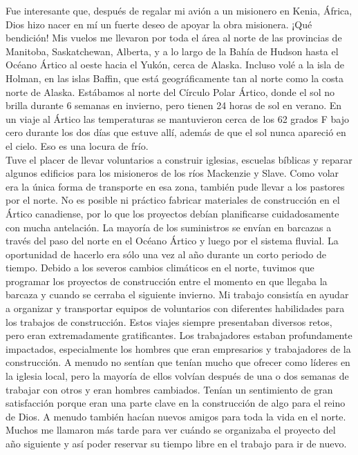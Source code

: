 \documentclass[twoside, 12pt]{book}
\begin{document}
Fue interesante que, después de regalar mi avión a un misionero en Kenia, África, Dios hizo nacer en mí un fuerte deseo de apoyar la obra misionera. ¡Qué bendición! Mis vuelos me llevaron por toda el área al norte de las provincias de Manitoba, Saskatchewan, Alberta, y a lo largo de la Bahía de Hudson hasta el Océano Ártico al oeste hacia el Yukón, cerca de Alaska. Incluso volé a la isla de Holman, en las islas Baffin, que está geográficamente tan al norte como la costa norte de Alaska. Estábamos al norte del Círculo Polar Ártico, donde el sol no brilla durante 6 semanas en invierno, pero tienen 24 horas de sol en verano. En un viaje al Ártico las temperaturas se mantuvieron cerca de los 62 grados F bajo cero durante los dos días que estuve allí, además de que el sol nunca apareció en el cielo. Eso es una locura de frío.\\

Tuve el placer de llevar voluntarios a construir iglesias, escuelas bíblicas y reparar algunos edificios para los misioneros de los ríos Mackenzie y Slave. Como volar era la única forma de transporte en esa zona, también pude llevar a los pastores por el norte. No es posible ni práctico fabricar materiales de construcción en el Ártico canadiense, por lo que los proyectos debían planificarse cuidadosamente con mucha antelación. La mayoría de los suministros se envían en barcazas a través del paso del norte en el Océano Ártico y luego por el sistema fluvial. La oportunidad de hacerlo era sólo una vez al año durante un corto periodo de tiempo. Debido a los severos cambios climáticos en el norte, tuvimos que programar los proyectos de construcción entre el momento en que llegaba la barcaza y cuando se cerraba el siguiente invierno.
Mi trabajo consistía en ayudar a organizar y transportar equipos de voluntarios con diferentes habilidades para los trabajos de construcción. Estos viajes siempre presentaban diversos retos, pero eran extremadamente gratificantes. Los trabajadores estaban profundamente impactados, especialmente los hombres que eran empresarios y trabajadores de la construcción. A menudo no sentían que tenían mucho que ofrecer como líderes en la iglesia local, pero la mayoría de ellos volvían después de una o dos semanas de trabajar con otros y eran hombres cambiados. Tenían un sentimiento de gran satisfacción porque eran una parte clave en la construcción de algo para el reino de Dios. A menudo también hacían nuevos amigos para toda la vida en el norte. Muchos me llamaron más tarde para ver cuándo se organizaba el proyecto del año siguiente y así poder reservar su tiempo libre en el trabajo para ir de nuevo.\\
\end{document}
